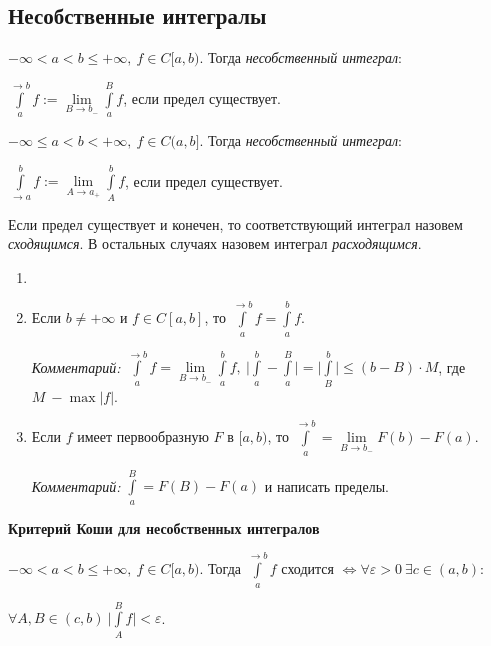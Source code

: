 \subsection{Несобственные интегралы}

\begin{definition}
    $-\infty < a < b\leq +\infty,\ f\in C[a, b).$ Тогда \textit{несобственный интеграл}: 
    
    $\int\limits_a^{\rightarrow b}f:=\lim \limits_{B\rightarrow b_-}\int\limits_a^Bf$, если предел существует.
\end{definition}

\begin{definition}
    $-\infty \leq a < b< +\infty,\ f\in C(a, b].$ Тогда \textit{несобственный интеграл}: 
    
    $\int\limits_{\rightarrow a}^b f:=\lim \limits_{A\rightarrow a_+}\int\limits_A^b f$, если предел существует.
\end{definition}

\begin{definition}
    Если предел существует и конечен, то соответствующий интеграл назовем \textit{сходящимся}. В остальных случаях назовем интеграл \textit{расходящимся}.
\end{definition}

\begin{remark}
    \begin{enumerate}
        \item[]
        \item Если $b\neq +\infty$ и $f\in C[a, b]$, то $\int\limits_a^{\rightarrow b} f = \int\limits_a^{b} f$.

        \textit{Комментарий:} $\int\limits_a^{\rightarrow b} f=\lim\limits_{B\rightarrow b_-}\int\limits_a^{b}f,\ \bigg|\int\limits_a^b -\int\limits_a^B\bigg|=\bigg|\int\limits_B^b\bigg|\leq (b-B)\cdot M$, где $M\ -\max |f|$.

        \item Если $f$ имеет первообразную $F$ в $[a, b)$, то $\int\limits_a^{\rightarrow b}=\lim\limits_{B\rightarrow b_-} F(b)-F(a)$.

        \textit{Комментарий:} $\int\limits_a^B=F(B)-F(a)$ и написать пределы.
    \end{enumerate}
\end{remark}

\begin{theorem}
    \textbf{Критерий Коши для несобственных интегралов}

    $-\infty <a<b\leq +\infty,\ f\in C[a, b)$. Тогда $\int\limits_a^{\rightarrow b}f$ сходится $\Leftrightarrow\forall \varepsilon>0\ \exists c\in (a, b): $
    
    $\forall A, B\in (c, b) \ \bigg|\int\limits_A^B f\bigg |<\varepsilon$.
\end{theorem}

